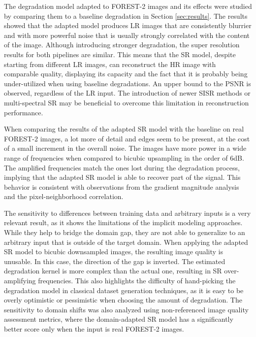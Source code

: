 The degradation model adapted to FOREST-2 images and its effects were studied by comparing them to a baseline degradation in Section \ref{sec:results}. The results showed that the adapted model produces LR images that are consistently blurrier and with more powerful noise that is usually strongly correlated with the content of the image. Although introducing stronger degradation, the super resolution results for both pipelines are similar. This means that the SR model, despite starting from different LR images, can reconstruct the HR image with comparable quality, displaying its capacity and the fact that it is probably being under-utilized when using baseline degradations. An upper bound to the PSNR is observed, regardless of the LR input. The introduction of newer SISR methods or multi-spectral SR may be beneficial to overcome this limitation in reconstruction performance.

When comparing the results of the adapted SR model with the baseline on real FOREST-2 images, a lot more of detail and edges seem to be present, at the cost of a small increment in the overall noise. The images have more power in a wide range of frequencies when compared to bicubic upsampling in the order of 6dB. The amplified frequencies match the ones lost during the degradation process, implying that the adapted SR model is able to recover part of the signal. This behavior is consistent with observations from the gradient magnitude analysis and the pixel-neighborhood correlation.

The sensitivity to differences between training data and arbitrary inputs is a very relevant result, as it shows the limitations of the implicit modeling approaches. While they help to bridge the domain gap, they are not able to generalize to an arbitrary input that is outside of the target domain.
When applying the adapted SR model to bicubic downsampled images, the resulting image quality is unusable.
In this case, the direction of the gap is inverted. The estimated degradation kernel is more complex than the actual one, resulting in SR over-amplifying frequencies. This also highlights the difficulty of hand-picking the degradation model in classical dataset generation techniques, as it is easy to be overly optimistic or pessimistic when choosing the amount of degradation.
The sensitivity to domain shifts was also analyzed using non-referenced image quality assessment metrics, where the domain-adapted SR model has a significantly better score only when the input is real FOREST-2 images. 

